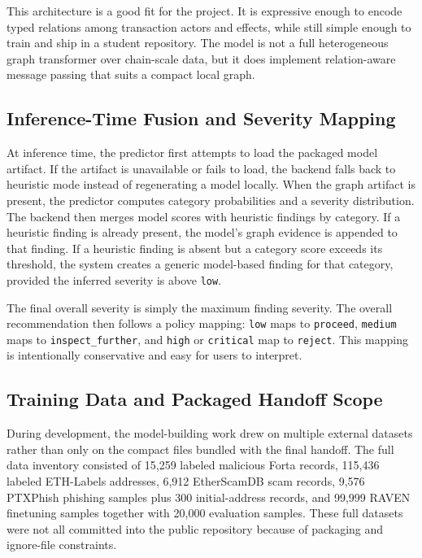 \documentclass[11pt]{article}
\begin{document}
This architecture is a good fit for the project. It is expressive enough to encode typed relations among transaction actors and effects, while still simple enough to train and ship in a student repository. The model is not a full heterogeneous graph transformer over chain-scale data, but it does implement relation-aware message passing that suits a compact local graph.

\subsection{Inference-Time Fusion and Severity Mapping}

At inference time, the predictor first attempts to load the packaged model artifact. If the artifact is unavailable or fails to load, the backend falls back to heuristic mode instead of regenerating a model locally. When the graph artifact is present, the predictor computes category probabilities and a severity distribution. The backend then merges model scores with heuristic findings by category. If a heuristic finding is already present, the model's graph evidence is appended to that finding. If a heuristic finding is absent but a category score exceeds its threshold, the system creates a generic model-based finding for that category, provided the inferred severity is above \texttt{low}.

The final overall severity is simply the maximum finding severity. The overall recommendation then follows a policy mapping: \texttt{low} maps to \texttt{proceed}, \texttt{medium} maps to \texttt{inspect\_further}, and \texttt{high} or \texttt{critical} map to \texttt{reject}. This mapping is intentionally conservative and easy for users to interpret.

\subsection{Training Data and Packaged Handoff Scope}

During development, the model-building work drew on multiple external datasets rather than only on the compact files bundled with the final handoff. The full data inventory consisted of 15,259 labeled malicious Forta records, 115,436 labeled ETH-Labels addresses, 6,912 EtherScamDB scam records, 9,576 PTXPhish phishing samples plus 300 initial-address records, and 99,999 RAVEN finetuning samples together with 20,000 evaluation samples. These full datasets were not all committed into the public repository because of packaging and ignore-file constraints.
\end{document}
